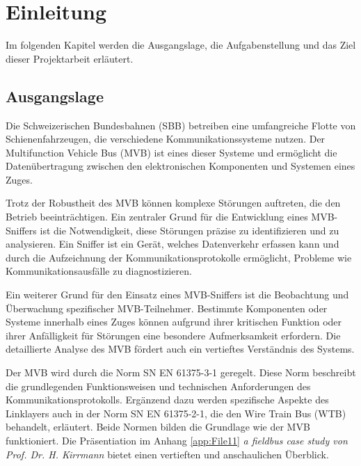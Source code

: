 

\chapter{Einleitung} %
\label{Einleitung}
Im folgenden Kapitel werden die Ausgangslage, die Aufgabenstellung und das Ziel dieser Projektarbeit erläutert.

\section{Ausgangslage} %
\label{Ausgangslage} %


Die Schweizerischen Bundesbahnen (SBB) betreiben eine umfangreiche Flotte von Schienenfahrzeugen, die verschiedene Kommunikationssysteme nutzen. Der Multifunction Vehicle Bus (MVB) ist eines dieser Systeme und ermöglicht die Datenübertragung zwischen den elektronischen Komponenten und Systemen eines Zuges.

Trotz der Robustheit des MVB können komplexe Störungen auftreten, die den Betrieb beeinträchtigen. Ein zentraler Grund für die Entwicklung eines MVB-Sniffers ist die Notwendigkeit, diese Störungen präzise zu identifizieren und zu analysieren. Ein Sniffer ist ein Gerät, welches Datenverkehr erfassen kann und durch die Aufzeichnung der Kommunikationsprotokolle ermöglicht, Probleme wie Kommunikationsausfälle zu diagnostizieren.

Ein weiterer Grund für den Einsatz eines MVB-Sniffers ist die Beobachtung und Überwachung spezifischer MVB-Teilnehmer. Bestimmte Komponenten oder Systeme innerhalb eines Zuges können aufgrund ihrer kritischen Funktion oder ihrer Anfälligkeit für Störungen eine besondere Aufmerksamkeit erfordern. Die detaillierte Analyse des MVB fördert auch ein vertieftes Verständnis des Systems.

Der MVB wird durch die Norm SN EN 61375-3-1 geregelt. Diese Norm beschreibt die grundlegenden Funktionsweisen und technischen Anforderungen des Kommunikationsprotokolls. Ergänzend dazu werden spezifische Aspekte des Linklayers auch in der Norm SN EN 61375-2-1, die den Wire Train Bus (WTB) behandelt, erläutert. Beide Normen bilden die Grundlage wie der MVB funktioniert. Die Präsentiation im Anhang \ref{app:File11} \textit{a fieldbus case study von Prof. Dr. H. Kirrmann} bietet einen vertieften und anschaulichen Überblick.

